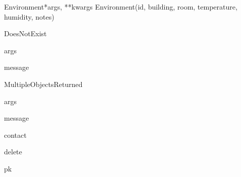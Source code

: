 \documentclass[letterpaper,10pt,english]{sphinxmanual}
\begin{document}
\hypertarget{data.models.Environment}{}\begin{classdesc}{Environment}{*args, **kwargs}
Environment(id, building, room, temperature, humidity, notes)

\hypertarget{data.models.Environment.DoesNotExist}{}\begin{excdesc}{DoesNotExist}~

\hypertarget{data.models.Environment.DoesNotExist.args}{}\begin{memberdesc}{args}\end{memberdesc}

\hypertarget{data.models.Environment.DoesNotExist.message}{}\begin{memberdesc}{message}\end{memberdesc}
\end{excdesc}

\hypertarget{data.models.Environment.MultipleObjectsReturned}{}\begin{excdesc}{MultipleObjectsReturned}~

\hypertarget{data.models.Environment.MultipleObjectsReturned.args}{}\begin{memberdesc}{args}\end{memberdesc}

\hypertarget{data.models.Environment.MultipleObjectsReturned.message}{}\begin{memberdesc}{message}\end{memberdesc}
\end{excdesc}

\hypertarget{data.models.Environment.contact}{}\begin{memberdesc}[Environment]{contact}\end{memberdesc}

\hypertarget{data.models.Environment.delete}{}\begin{methoddesc}[Environment]{delete}{}\end{methoddesc}

\hypertarget{data.models.Environment.pk}{}\begin{memberdesc}[Environment]{pk}\end{memberdesc}


\end{classdesc}
\end{document}
